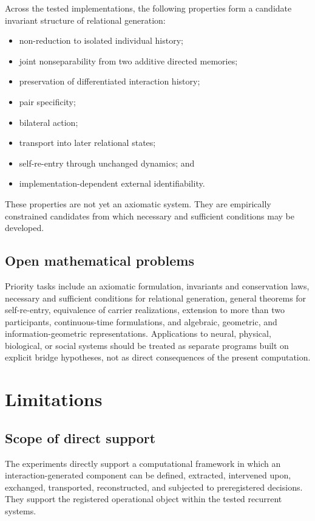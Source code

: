 \documentclass[11pt,a4paper]{article}
\begin{document}
Across the tested implementations, the following properties form a candidate invariant structure of relational generation:
\begin{itemize}
  \item non-reduction to isolated individual history;
  \item joint nonseparability from two additive directed memories;
  \item preservation of differentiated interaction history;
  \item pair specificity;
  \item bilateral action;
  \item transport into later relational states;
  \item self-re-entry through unchanged dynamics; and
  \item implementation-dependent external identifiability.
\end{itemize}
These properties are not yet an axiomatic system. They are empirically constrained candidates from which necessary and sufficient conditions may be developed.

\subsection{Open mathematical problems}

Priority tasks include an axiomatic formulation, invariants and conservation laws, necessary and sufficient conditions for relational generation, general theorems for self-re-entry, equivalence of carrier realizations, extension to more than two participants, continuous-time formulations, and algebraic, geometric, and information-geometric representations. Applications to neural, physical, biological, or social systems should be treated as separate programs built on explicit bridge hypotheses, not as direct consequences of the present computation.

\section{Limitations}

\subsection{Scope of direct support}

The experiments directly support a computational framework in which an interaction-generated component can be defined, extracted, intervened upon, exchanged, transported, reconstructed, and subjected to preregistered decisions. They support the registered operational object within the tested recurrent systems.
\end{document}
